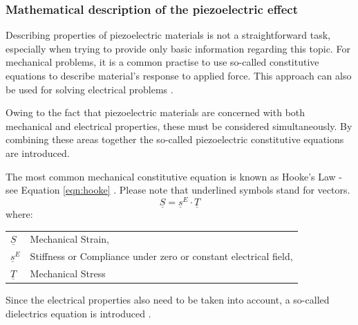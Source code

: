 \documentclass[12pt,a4paper]{article}
\makeatletter
\newenvironment{conditions}
  {\par\vspace{\abovedisplayskip}\noindent\begin{tabular}{>{$}l<{$} @{${}-{}$} l}}
  {\end{tabular}\par\vspace{\belowdisplayskip}}
\makeatother
\begin{document}
\subsubsection{Mathematical description of the piezoelectric effect}
Describing properties of piezoelectric materials is not a straightforward task, especially when trying to provide only basic information regarding this topic. For mechanical problems, it is a common practise to use so-called constitutive equations to describe material's response to applied force. This approach can also be used for solving electrical problems \cite{piezomath}.
\par
Owing to the fact that piezoelectric materials are concerned with both mechanical and electrical properties, these must be considered simultaneously. By combining these areas together the so-called piezoelectric constitutive equations are introduced.
\par
The most common mechanical constitutive equation is known as Hooke's Law -see Equation \ref{eqn:hooke} \cite{piezomath}. Please note that underlined symbols stand for vectors.
\begin{equation}
	\underline{S} = \underline{s}^E \cdot \underline{T}
	\label{eqn:hooke}
\end{equation}
where:
\begin{conditions}
	\underline{S}     &  Mechanical Strain, \\
 	\underline{s}^E     &  Stiffness or Compliance under zero or constant electrical field, \\   
 	\underline{T} &  Mechanical Stress	
\end{conditions}

Since the electrical properties also need to be taken into account, a so-called dielectrics equation is introduced  \cite{cmos}.
\end{document}
